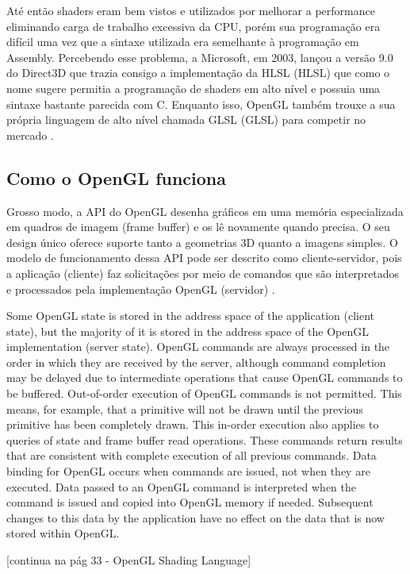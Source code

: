 Até então shaders eram bem vistos e utilizados por melhorar a performance eliminando carga de trabalho excessiva da \acrshort{CPU}, porém sua programação era difícil uma vez que a sintaxe utilizada era semelhante à programação em Assembly. Percebendo esse problema, a Microsoft, em 2003, lançou a versão 9.0 do Direct3D que trazia consigo a implementação da HLSL (\acrlong{HLSL}) que como o nome sugere permitia a programação de shaders em alto nível e possuia uma sintaxe bastante parecida com C. Enquanto isso, OpenGL também trouxe a sua própria linguagem de alto nível chamada GLSL (\acrlong{GLSL}) para competir no mercado \cite{openGLBook}. 

\subsection{Como o OpenGL funciona}
\label{sec:como-opengl-funciona}

Grosso modo, a API do OpenGL desenha gráficos em uma memória especializada em quadros de imagem (frame buffer) e os lê novamente quando precisa. O seu design único oferece suporte tanto a geometrias 3D quanto a imagens simples. O modelo de funcionamento dessa API pode ser descrito como cliente-servidor, pois a aplicação (cliente) faz solicitações por meio de comandos que são interpretados e processados pela implementação OpenGL (servidor) \cite{GLSLBook}.

Some OpenGL state is stored in the address space of the application (client state), but the majority of it is stored in the address space of the OpenGL implementation (server state). OpenGL commands are always processed in the order in which they are received by the server, although command completion may be delayed due to intermediate operations that cause OpenGL commands to be buffered. Out-of-order execution of OpenGL commands is not permitted. This means, for example, that a primitive will not be drawn until the previous primitive has been completely drawn. This in-order execution also applies to queries of state and frame buffer read operations. These commands return results that are consistent with complete execution of all previous commands. Data binding for OpenGL occurs when commands are issued, not when they are executed. Data passed to an OpenGL command is interpreted when the command is issued and copied into OpenGL memory if needed. Subsequent changes to this data by the application have no effect on the data that is now stored within OpenGL. 

[continua na pág 33 - OpenGL Shading Language]


